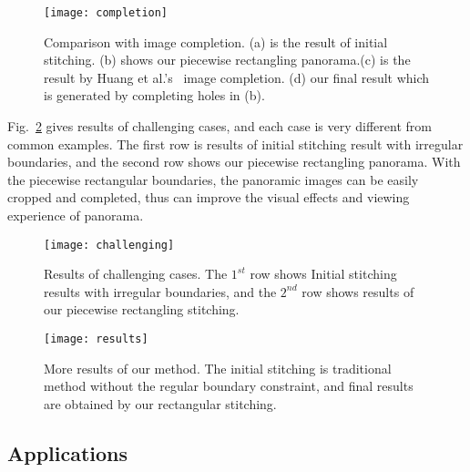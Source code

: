\documentclass[10pt,journal,compsoc]{IEEEtran}
\begin{document}
 \begin{figure} %
  \centering
  \texttt{[image: completion]}
  \caption{Comparison with image completion. (a) is the result of initial stitching. (b) shows our piecewise rectangling panorama.(c) is the result by Huang et al.'s~\cite{journals/tog/HuangKAK14} image completion. (d) our final result which is generated by completing holes in (b). } \label{fig:completion}
\end{figure}

\begin{comment}
 \begin{figure} %
  \centering
  \texttt{[image: crop]}
  \caption{Content-ware cropping. (a) Chen et al.'s~\cite{conf/eccv/ChenC16} stitching with global prior. (b) He et al.'s~\cite{journals/tog/HeC013} rectangular stitching result.
  (c) Our piecewise rectangular stitching result.} \label{fig:crop}
\end{figure}
\end{comment}

Fig.~\ref{fig:challenging_cases} gives results of challenging cases, and each case is very different from common examples. 
The first row is results of initial stitching result with irregular boundaries, and the second row shows our piecewise rectangling panorama. 
With the piecewise rectangular boundaries, the panoramic images can be easily cropped and completed, thus can improve the visual effects and viewing experience of panorama.

 \begin{figure} %
  \centering
  \texttt{[image: challenging]}
  \caption{Results of challenging cases. The $1^{st}$ row shows Initial stitching results with irregular boundaries, and the $2^{nd}$ row shows results of our piecewise rectangling stitching.} \label{fig:challenging_cases}
\end{figure}

 \begin{figure*} %
  \centering
  \texttt{[image: results]}
  \caption{More results of our method. The initial stitching is traditional method without the regular boundary constraint, and final results are obtained by our rectangular stitching.} \label{fig:more_results}
\end{figure*}

 \subsection{Applications}
\end{document}
